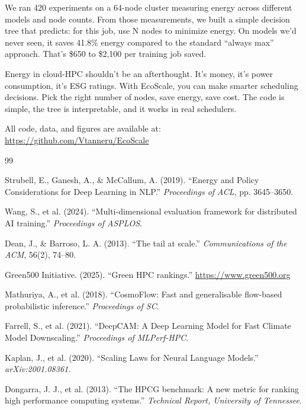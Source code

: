 \documentclass[conference]{IEEEtran}
\begin{document}
We ran 420 experiments on a 64-node cluster measuring energy across different models and node counts. From those measurements, we built a simple decision tree that predicts: for this job, use N nodes to minimize energy. On models we'd never seen, it saves 41.8\% energy compared to the standard ``always max'' approach. That's \$650 to \$2,100 per training job saved.

Energy in cloud-HPC shouldn't be an afterthought. It's money, it's power consumption, it's ESG ratings. With EcoScale, you can make smarter scheduling decisions. Pick the right number of nodes, save energy, save cost. The code is simple, the tree is interpretable, and it works in real schedulers.

All code, data, and figures are available at: \url{https://github.com/Vtanneru/EcoScale}

\begin{thebibliography}{99}

 Strubell, E., Ganesh, A., \& McCallum, A. (2019). ``Energy and Policy Considerations for Deep Learning in NLP.'' \textit{Proceedings of ACL}, pp. 3645--3650.

 Wang, S., et al. (2024). ``Multi-dimensional evaluation framework for distributed AI training.'' \textit{Proceedings of ASPLOS}.

 Dean, J., \& Barroso, L. A. (2013). ``The tail at scale.'' \textit{Communications of the ACM}, 56(2), 74--80.

 Green500 Initiative. (2025). ``Green HPC rankings.'' \url{https://www.green500.org}

 Mathuriya, A., et al. (2018). ``CosmoFlow: Fast and generalisable flow-based probabilistic inference.'' \textit{Proceedings of SC}.

 Farrell, S., et al. (2021). ``DeepCAM: A Deep Learning Model for Fast Climate Model Downscaling.'' \textit{Proceedings of MLPerf-HPC}.

 Kaplan, J., et al. (2020). ``Scaling Laws for Neural Language Models.'' \textit{arXiv:2001.08361}.

 Dongarra, J. J., et al. (2013). ``The HPCG benchmark: A new metric for ranking high performance computing systems.'' \textit{Technical Report, University of Tennessee}.

\end{thebibliography}
\end{document}

